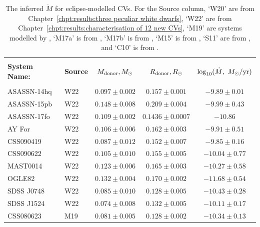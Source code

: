 \begin{table}
    \centering
    \caption{The inferred $\dot M$ for eclipse-modelled CVs. For the Source column, `W20' are from Chapter~\ref{chpt:results:three peculiar white dwarfs}, `W22' are from Chapter~\ref{chpt:results:characterisation of 12 new CVs}, `M19' are systems modelled by \citet{McAllister2019}, `M17a' is from \citet{mcallister2017}, `M17b' is from \citet{mcallister2017b}, `M15' is from \citet{mcallister2015}, `S11' are from \citet{Savoury2011}, and `C10' is from \citet{copperwheat2010}.}
    \label{table:results:mdot modelling}
    \begin{tabular}{llccc}
        \hline \\
        {\bf System Name:} & \textbf{Source} & \textbf{$M_{\rm donor}, M_\odot$}  & \textbf{$R_{\rm donor}, R_\odot$}  & \textbf{$\log_{10}(\dot M,\ M_\odot / {\rm yr})$} \\
        \hline \hline \\
        ASASSN-14hq      & W22  &  $0.097 \pm 0.002$    & $0.157 \pm 0.001$     & $  -9.89 \pm 0.01$    \\
        ASASSN-15pb      & W22  &  $0.148 \pm 0.008$    & $0.209 \pm 0.004$     & $  -9.99 \pm 0.43$    \\
        ASASSN-17fo      & W22  &  $0.109 \pm 0.002$    & $0.1436 \pm 0.0007$   & $ -10.86$             \\
        AY For           & W22  &  $0.106 \pm 0.006$    & $0.162 \pm 0.003$     & $  -9.91 \pm 0.51$    \\
        CSS090419        & W22  &  $0.087 \pm 0.012$    & $0.152 \pm 0.007$     & $  -9.85 \pm 0.16$    \\
        CSS090622        & W22  &  $0.105 \pm 0.010$    & $0.155 \pm 0.005$     & $ -10.04 \pm 0.77$    \\
        MAST0014         & W22  &  $0.123 \pm 0.006$    & $0.165 \pm 0.003$     & $ -10.27 \pm 0.58$    \\
        OGLE82           & W22  &  $0.132 \pm 0.004$    & $0.170 \pm 0.002$     & $ -11.68 \pm 0.54$    \\
        SDSS J0748       & W22  &  $0.085 \pm 0.010$    & $0.128 \pm 0.005$     & $ -10.43 \pm 0.28$    \\
        SDSS J1524       & W22  &  $0.074 \pm 0.008$    & $0.132 \pm 0.005$     & $ -10.11 \pm 0.17$    \\
        CSS080623        & M19  &  $0.081 \pm 0.005$    & $0.128 \pm 0.002$     & $ -10.34 \pm 0.13$    \\

\end{tabular}
\end{table}

